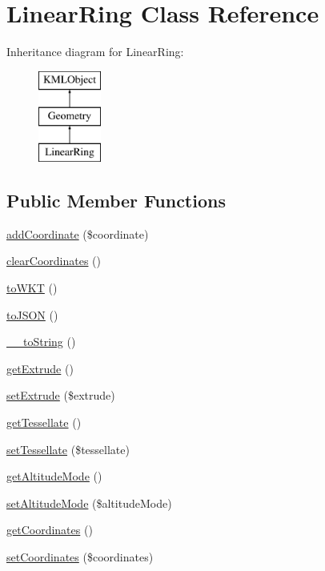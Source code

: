 \hypertarget{classLinearRing}{
\section{LinearRing Class Reference}
\label{d6/d44/classLinearRing}
}
Inheritance diagram for LinearRing:\begin{figure}[H]
\begin{center}
\leavevmode
\includegraphics[height=3.000000cm]{d6/d44/classLinearRing}
\end{center}
\end{figure}
\subsection*{Public Member Functions}
\begin{DoxyCompactItemize}
\item 
\hyperlink{classLinearRing_afd024f9abd603cedc9504506408e411b}{addCoordinate} (\$coordinate)
\item 
\hyperlink{classLinearRing_a5d3f11b9c97d8a36e21d41fd27b0ad46}{clearCoordinates} ()
\item 
\hyperlink{classLinearRing_a667aa354478f4652dcbe476811f86271}{toWKT} ()
\item 
\hyperlink{classLinearRing_aa07c79aa9b11b910efece1071a379b71}{toJSON} ()
\item 
\hyperlink{classLinearRing_a5144c3bf7183daa1437ef81468388755}{\_\-\_\-toString} ()
\item 
\hyperlink{classLinearRing_ad0bd836d7dbe7dff42ea01a5eb98817f}{getExtrude} ()
\item 
\hyperlink{classLinearRing_a13d8f861dca75bafda86e29990a52671}{setExtrude} (\$extrude)
\item 
\hyperlink{classLinearRing_ad68416048909448c7dda9cf7327df095}{getTessellate} ()
\item 
\hyperlink{classLinearRing_a524822f9f12c412fd28ac8d55843867b}{setTessellate} (\$tessellate)
\item 
\hyperlink{classLinearRing_aad66471e43fa9914fbed681363ddd54b}{getAltitudeMode} ()
\item 
\hyperlink{classLinearRing_a79ba4ba791e54476b713dafa2c7f604e}{setAltitudeMode} (\$altitudeMode)
\item 
\hyperlink{classLinearRing_a51f6c0b2d43ff60a0bb06accf8f1b627}{getCoordinates} ()
\item 
\hyperlink{classLinearRing_a8a6e86cce7c62432b48d166d4938dac2}{setCoordinates} (\$coordinates)
\end{DoxyCompactItemize}


